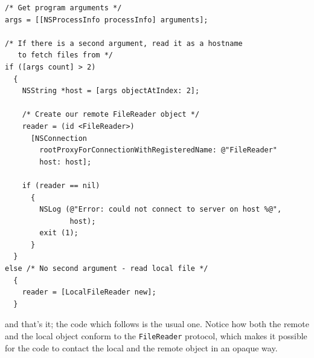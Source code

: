 \documentclass[a4paper]{article}
\begin{document}
\begin{verbatim}
/* Get program arguments */
args = [[NSProcessInfo processInfo] arguments];
  
/* If there is a second argument, read it as a hostname 
   to fetch files from */
if ([args count] > 2)
  {
    NSString *host = [args objectAtIndex: 2];

    /* Create our remote FileReader object */
    reader = (id <FileReader>)
      [NSConnection
        rootProxyForConnectionWithRegisteredName: @"FileReader" 
        host: host];
      
    if (reader == nil)
      {
        NSLog (@"Error: could not connect to server on host %@",
               host);
        exit (1);
      }
  }
else /* No second argument - read local file */
  {
    reader = [LocalFileReader new];
  }
\end{verbatim}
and that's it; the code which follows is the usual one.  Notice how
both the remote and the local object conform to the
\texttt{FileReader} protocol, which makes it possible for the code to
contact the local and the remote object in an opaque way.
\end{document}

